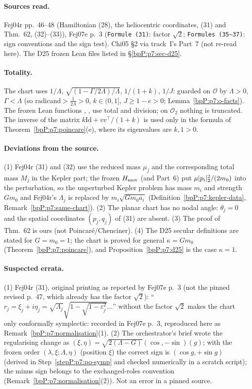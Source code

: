 \paragraph{Sources read.} Fej04r pp.~46--48 (Hamiltonian (28), the heliocentric coordinates, (31) and Thm.~62, (32)--(33)), Fej07e p.~3 (\texttt{Formule (31)}: factor $\sqrt2$; \texttt{Formules (35--37)}: sign conventions and the sign test). Chi05 \S2 via track~I's Part~7 (not re-read here). The D25 frozen Lean files listed in \S\ref{bpP:p7:sec-d25}.

\paragraph{Totality.} The chart uses $1/\Lambda$, $\sqrt{(1-\Gamma/2\Lambda)/\Lambda}$, $1/(1+k)$, $1/J$: guarded on $\mathcal O$ by $\Lambda>0$, $\Gamma<\Lambda$ (so radicand$>\tfrac1{2\Lambda}>0$, $k\in(0,1]$, $J\ge1-e>0$; Lemma~\ref{bpP:p7:o-facts}). The frozen Lean functions , ,  use total  and division; on $\mathcal O_2$ nothing is truncated. The inverse of the matrix $k\mathrm{Id}+vv^\top/(1+k)$ is used only in the formula of Theorem~\ref{bpP:p7:poincare}(e), where its eigenvalues are $k,1>0$.

\paragraph{Deviations from the source.} (1) Fej04r (31) and (32) use the reduced mass $\mu_j$ and the corresponding total mass $M_j$ in the Kepler part; the frozen $H_{\rm mov}$ (and Part~6) put $\mu\lvert p_i\rvert_2^2/(2m_0)$ into the perturbation, so the unperturbed Kepler problem has mass $m_i$ and strength $Gm_0$ and Fej04r's $\Lambda_j$ is replaced by $m_i\sqrt{Gm_0a_i}$ (Definition~\ref{bpP:p7:kepler-data}, Remark~\ref{bpP:p7:same-chart}). (2) The planar chart has no nodal angle: $\theta_j=0$ and the spatial coordinates $(p_j,q_j)$ of (31) are absent. (3) The proof of Thm.~62 is ours (not Poincar\'e/Chenciner).
(4) The D25 secular definitions are stated for $G=m_0=1$; the chart is proved for general $\kappa=Gm_0$ (Theorem~\ref{bpP:p7:poincare}), and Proposition~\ref{bpP:p7:d25} is the case $\kappa=1$.

\paragraph{Suspected errata.} (1) Fej04r (31), original printing as reported by Fej07e p.~3 (not the pinned revised p.~47, which already has the factor $\sqrt2$): ``$r_j=\xi_j+i\eta_j=\sqrt{\Lambda_j}\sqrt{1-\sqrt{1-\varepsilon_j^2}}\ldots$'' without the factor $\sqrt2$ makes the chart only conformally symplectic: recorded in Fej07e p.~3, reproduced here as Remark~\ref{bpP:p7:normalisation}(1). (2) The orchestrator's brief wrote the regularising change as $(\xi,\eta)=\sqrt{2(\Lambda-G)}(\cos,-\sin)(g)$; with the frozen order $(\lambda,\xi;\Lambda,\eta)$ (position $\xi$) the correct sign is $(\cos g,+\sin g)$ (derived in Step~\ref{stepP:p7:po-symp} and checked numerically in a scratch script); the minus sign belongs to the exchanged-roles convention (Remark~\ref{bpP:p7:normalisation}(2)). Not an error in a pinned source.

